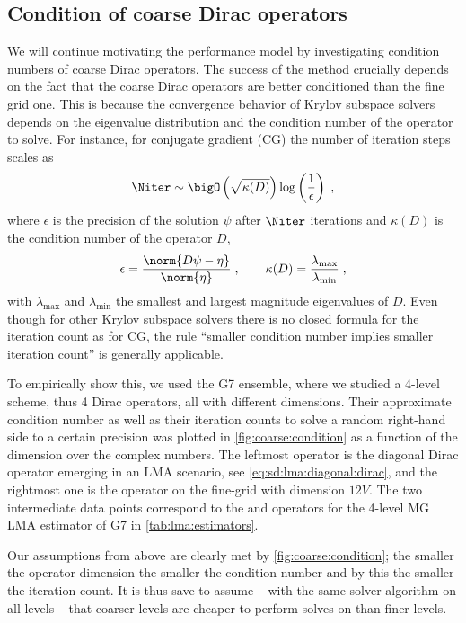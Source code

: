 \subsection{Condition of coarse Dirac operators}
\label{sec:numerics:coarse:condition}

We will continue motivating the performance model by investigating condition numbers of coarse Dirac operators.
The success of the method crucially depends on the fact that the coarse Dirac operators are better conditioned than the fine grid one.
This is because the convergence behavior of Krylov subspace solvers depends on the eigenvalue distribution and the condition number of the operator to solve.
For instance, for conjugate gradient (CG) the number of iteration steps scales as~\cite{shewchuk1994introduction}
\begin{equation}
\Niter \sim \bigO\left(\sqrt{\kappa(D)}\right) \log\left(\frac{1}{\epsilon}\right) \;,
\end{equation}
where $\epsilon$ is the precision of the solution $\psi$ after $\Niter$ iterations and $\kappa(D)$ is the condition number of the operator $D$,
\begin{equation}
\epsilon = \frac{\norm{D \psi - \eta}}{\norm{\eta}} \;,
\qquad
\kappa(D) = \frac{\lambda_{\text{max}}}{\lambda_{\text{min}}} \;,
\end{equation}
with $\lambda_{\text{max}}$ and $\lambda_{\text{min}}$ the smallest and largest magnitude eigenvalues of $D$.
Even though for other Krylov subspace solvers there is no closed formula for the iteration count as for CG, the rule ``smaller condition number implies smaller iteration count'' is generally applicable.

To empirically show this, we used the G7 ensemble, where we studied a 4-level scheme, thus \num{4} Dirac operators, all with different dimensions.
Their approximate condition number as well as their iteration counts to solve a random right-hand side to a certain precision was plotted in \cref{fig:coarse:condition} as a function of the dimension over the complex numbers.
The leftmost operator is the diagonal Dirac operator emerging in an LMA scenario, see \cref{eq:sd:lma:diagonal:dirac}, and the rightmost one is the operator on the fine-grid with dimension $12 V$.
The two intermediate data points correspond to the  and  operators for the 4-level MG LMA estimator of G7 in \cref{tab:lma:estimators}.

Our assumptions from above are clearly met by \cref{fig:coarse:condition}; the smaller the operator dimension the smaller the condition number and by this the smaller the iteration count.
It is thus save to assume -- with the same solver algorithm on all levels -- that coarser levels are cheaper to perform solves on than finer levels.

